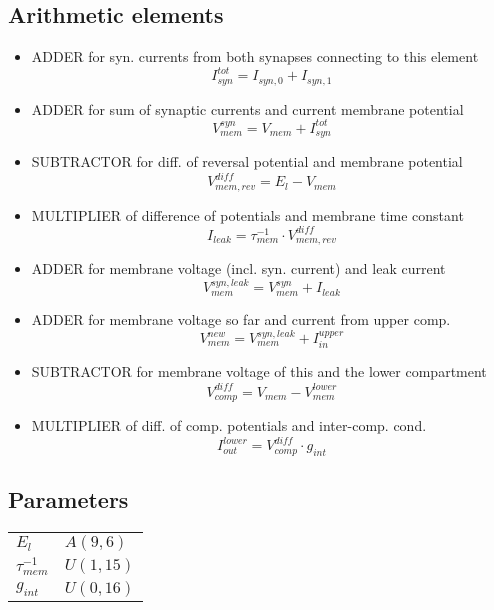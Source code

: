 \subsection{Arithmetic elements}
\begin{itemize}
	\item ADDER for syn. currents from both synapses connecting to this element
		\begin{equation}
			I_{syn}^{tot} = I_{syn,0} + I_{syn,1}
		\end{equation}
	\item ADDER for sum of synaptic currents and current membrane potential
		\begin{equation}
			V_{mem}^{syn} = V_{mem} + I_{syn}^{tot}
		\end{equation}
	\item SUBTRACTOR for diff. of reversal potential and membrane potential
		\begin{equation}
			V_{mem,rev}^{diff} = E_l - V_{mem}
		\end{equation}
	\item MULTIPLIER of difference of potentials and membrane time constant
		\begin{equation}
			I_{leak} = \tau_{mem}^{-1} \cdot V_{mem,rev}^{diff}
		\end{equation}
	\item ADDER for membrane voltage (incl. syn. current) and leak current
		\begin{equation}
			V_{mem}^{syn,leak} = V_{mem}^{syn} + I_{leak}
		\end{equation}
	\item ADDER for membrane voltage so far and current from upper comp.
		\begin{equation}
			V_{mem}^{new} = V_{mem}^{syn,leak} + I_{in}^{upper}
		\end{equation}
	\item SUBTRACTOR for membrane voltage of this and the lower compartment
		\begin{equation}
			V_{comp}^{diff} = V_{mem} - V_{mem}^{lower}
		\end{equation}
	\item MULTIPLIER of diff. of comp. potentials and inter-comp. cond.
		\begin{equation}
			I_{out}^{lower} = V_{comp}^{diff} \cdot g_{int}
		\end{equation}
\end{itemize}
\subsection{Parameters}
\begin{tabular}{ll}
$E_l$ & $A(9,6)$\\
$\tau_{mem}^{-1}$ & $U(1,15)$\\
$g_{int}$ & $U(0,16)$\\
\end{tabular}
